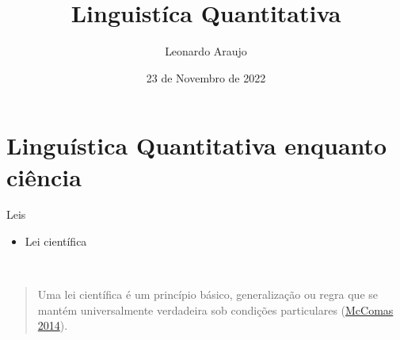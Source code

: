 \documentclass[
  ignorenonframetext,
  aspectratio=169]{beamer}
\title{Linguistíca Quantitativa}
\author{Leonardo Araujo}
\date{23 de Novembro de 2022}
\providecommand{\tightlist}{%
  \setlength{\itemsep}{0pt}\setlength{\parskip}{0pt}}
\begin{document}
\frame{\titlepage}

\hypertarget{linguuxedstica-quantitativa-enquanto-ciuxeancia}{%
\section{Linguística Quantitativa enquanto
ciência}\label{linguuxedstica-quantitativa-enquanto-ciuxeancia}}

\begin{frame}{Leis}
\protect\hypertarget{leis}{}
\begin{itemize}
\tightlist
\item
  Lei científica
\end{itemize}

~

\begin{quote}
Uma lei científica é um princípio básico, generalização ou regra que se
mantém universalmente verdadeira sob condições particulares
(\protect\hyperlink{ref-mccomas2014}{McComas 2014}).
\end{quote}

\end{frame}
\end{document}

